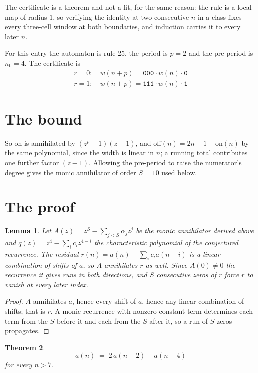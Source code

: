 \documentclass[11pt,a4paper]{article}
\theoremstyle{plain}
\newtheorem{theorem}{Theorem}
\newtheorem{lemma}[theorem]{Lemma}
\theoremstyle{definition}
\begin{document}
The certificate is a theorem and not a fit, for the same reason: the rule is a local map of
radius $1$, so verifying the identity at two consecutive $n$ in a class fixes every three-cell
window at both boundaries, and induction carries it to every later $n$.

For this entry the automaton is rule 25, the period is $p=2$ and the pre-period is $n_0=4$.
The certificate is
\begin{gather*}
r=0:\quad w(n+p) = \texttt{000} \cdot w(n) \cdot \texttt{0} \\
r=1:\quad w(n+p) = \texttt{111} \cdot w(n) \cdot \texttt{1}
\end{gather*}

\section{The bound}

So
$\mathrm{on}$ is annihilated by $(z^p-1)(z-1)$, and $\mathrm{off}(n)=2n+1-\mathrm{on}(n)$ by
the same polynomial, since the width is linear in $n$; a running total contributes one further
factor $(z-1)$. Allowing the pre-period to raise the numerator's degree gives the monic
annihilator of order $S=10$ used below.

\section{The proof}

\begin{lemma}\label{lem:crit}
Let $A(z)=z^S-\sum_{j<S}\alpha_jz^{j}$ be the monic annihilator derived above and
$q(z)=z^{4}-\sum_ic_iz^{4-i}$ the characteristic polynomial of the conjectured
recurrence. The residual $r(n)=a(n)-\sum_ic_ia(n-i)$ is a linear combination of shifts of $a$,
so $A$ annihilates $r$ as well. Since $A(0)\ne0$ the recurrence it gives runs in both
directions, and $S$ consecutive zeros of $r$ force $r$ to vanish at every later index.
\end{lemma}

\begin{proof}
$A$ annihilates $a$, hence every shift of $a$, hence any linear combination of shifts; that is
$r$. A monic recurrence with nonzero constant term determines each term from the $S$ before it
and each from the $S$ after it, so a run of $S$ zeros propagates.
\end{proof}

\begin{theorem}
\[
a(n)\;=\;2\,a(n-2) - a(n-4)
\]
for every $n>7$.
\end{theorem}
\end{document}
